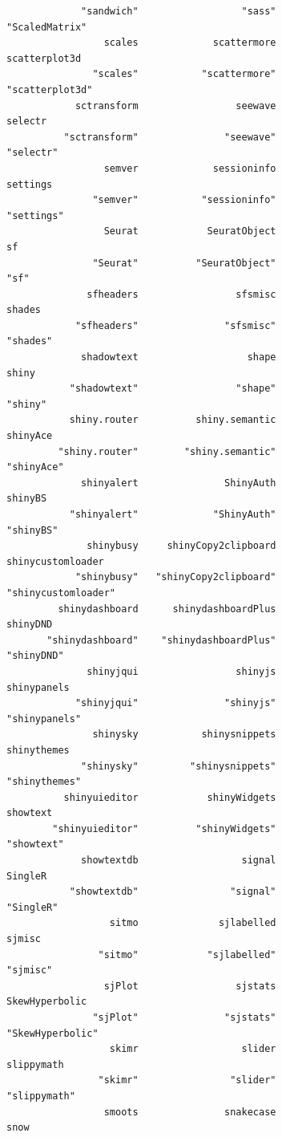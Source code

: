 \documentclass[
  letterpaper,
  DIV=11,
  numbers=noendperiod]{scrreprt}
\begin{document}
\begin{verbatim}
             "sandwich"                  "sass"          "ScaledMatrix" 
                 scales             scattermore           scatterplot3d 
               "scales"           "scattermore"         "scatterplot3d" 
            sctransform                 seewave                 selectr 
          "sctransform"               "seewave"               "selectr" 
                 semver             sessioninfo                settings 
               "semver"           "sessioninfo"              "settings" 
                 Seurat            SeuratObject                      sf 
               "Seurat"          "SeuratObject"                    "sf" 
              sfheaders                 sfsmisc                  shades 
            "sfheaders"               "sfsmisc"                "shades" 
             shadowtext                   shape                   shiny 
           "shadowtext"                 "shape"                 "shiny" 
           shiny.router          shiny.semantic                shinyAce 
         "shiny.router"        "shiny.semantic"              "shinyAce" 
             shinyalert               ShinyAuth                 shinyBS 
           "shinyalert"             "ShinyAuth"               "shinyBS" 
              shinybusy     shinyCopy2clipboard       shinycustomloader 
            "shinybusy"   "shinyCopy2clipboard"     "shinycustomloader" 
         shinydashboard      shinydashboardPlus                shinyDND 
       "shinydashboard"    "shinydashboardPlus"              "shinyDND" 
              shinyjqui                 shinyjs             shinypanels 
            "shinyjqui"               "shinyjs"           "shinypanels" 
               shinysky           shinysnippets             shinythemes 
             "shinysky"         "shinysnippets"           "shinythemes" 
          shinyuieditor            shinyWidgets                showtext 
        "shinyuieditor"          "shinyWidgets"              "showtext" 
             showtextdb                  signal                 SingleR 
           "showtextdb"                "signal"               "SingleR" 
                  sitmo              sjlabelled                  sjmisc 
                "sitmo"            "sjlabelled"                "sjmisc" 
                 sjPlot                 sjstats          SkewHyperbolic 
               "sjPlot"               "sjstats"        "SkewHyperbolic" 
                  skimr                  slider              slippymath 
                "skimr"                "slider"            "slippymath" 
                 smoots               snakecase                    snow 

\end{verbatim}
\end{document}

